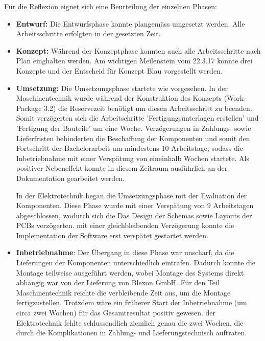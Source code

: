 Für die  Reflexion eignet sich eine Beurteilung der einzelnen Phasen:
\begin{itemize}
	\item \textbf{Entwurf:} Die Entwurfsphase konnte plangemäss umgesetzt werden. Alle Arbeitsschritte erfolgten in der gesetzten Zeit.
	
	\item \textbf{Konzept:} Während der Konzeptphase konnten auch alle Arbeitsschritte nach Plan einghalten werden. Am wichtigen Meilenstein vom 22.3.17 konnte drei Konzepte und der Entscheid für Konzept Blau vorgestellt werden.
	
	\item \textbf{Umsetzung:} Die Umsetzungsphase startete wie vorgesehen. In der Maschinentechnik wurde während der Konstruktion des Konzepts (Work-Package 3.2) die Reservezeit benötigt um diesen Arbeitsschritt zu beenden. Somit verzögerten sich die Arbeitschritte 'Fertigungsunterlagen erstellen' und 'Fertigung der Bauteile' um eine Woche. Verzögerungen in Zahlungs- sowie Lieferfristen behinderten die Beschaffung der Komponenten und somit den Fortschritt der Bachelorarbeit um mindestens 10 Arbeitstage, sodass die Inbetriebnahme mit einer Verspätung von eineinhalb Wochen startete. 
	Als positiver Nebeneffekt konnte in diesem Zeitraum ausführlich an der Dokumentation gearbeitet werden.
	\newline
	
	In der Elektrotechnik began die Umsetzungsphase mit der Evaluation der Komponenten. Diese Phase wurde mit einer Verspätung von 9 Arbeitstagen abgeschlossen, wodurch sich die Das Design der Schemas sowie Layouts der PCBs verzögerten. mit einer gleichbleibenden Verzögerung konnte die Implementation der Software erst verspätet gestartet werden.
	
	\item \textbf{Inbetriebnahme}: Der Übergang in diese Phase war unscharf, da die Lieferungen der Komponenten unterschiedlich eintrafen. Dadurch konnte die Montage teilweise ausgeführt werden, wobei Montage des Systems direkt abhängig war von der Lieferung von Blexon GmbH. Für den Teil Maschinentechnik reichte die verbleibende Zeit aus, um die Montage fertigzustellen. Trotzdem wäre ein früherer Start der Inbetriebnahme (um circa zwei Wochen) für das Gesamtresultat positiv gewesen. der Elektrotechnik fehlte schlussendlich ziemlich genau die zwei Wochen, die durch die Komplikationen in Zahlung- und Lieferungstechnisch auftraten.

	
\end{itemize} 

